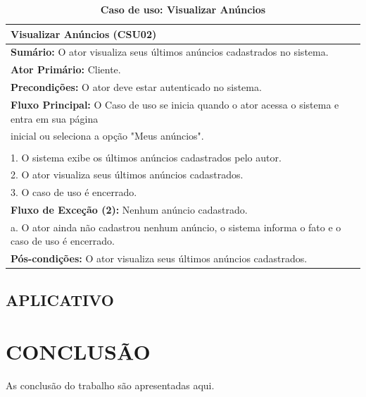 \documentclass[
	12pt,				%
	openright,			%
	oneside,			%
	a4paper,			%
	chapter=TITLE,		%
	section=TITLE,		%
	english,			%
	french,				%
	spanish,			%
	brazil				%
	]{abntex2}
\begin{document}
\begin{table}[h!]
	\center\scriptsize
	\caption{\textbf{Caso de uso: Visualizar Anúncios}}
	\begin{tabular}{|l|} \hline \label{tab-csu-visualizarAnuncios}
		\textbf{Visualizar Anúncios (CSU02)} \\ \hline
		
		\textbf{Sumário:} O ator visualiza seus últimos anúncios cadastrados no sistema. \\
		\textbf{Ator Primário:} Cliente. \\
		\textbf{Precondições:} O ator deve estar autenticado no sistema. \\ \hline
		
		\textbf{Fluxo Principal:} O Caso de uso se inicia quando o ator acessa o sistema e entra em sua página \\ inicial ou seleciona a opção "Meus anúncios". \\ \\
		

		1.	O sistema exibe os últimos anúncios cadastrados pelo autor. \\
		2.	O ator visualiza seus últimos anúncios cadastrados. \\
		3.	O caso de uso é encerrado. \\ \hline
		
		\textbf{Fluxo de Exceção (2):} Nenhum anúncio cadastrado.\\
		a. O ator ainda não cadastrou nenhum anúncio, o sistema informa o fato e o caso de uso é encerrado.\\ \hline
		
		\textbf{Pós-condições:} O ator visualiza seus últimos anúncios cadastrados. \\ \hline
		
	\end{tabular}
\end{table}

\section{APLICATIVO}


\chapter{CONCLUSÃO}

As conclusão do trabalho são apresentadas aqui.

\end{document}
